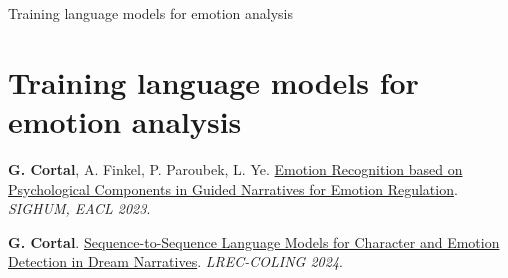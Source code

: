 \documentclass[handout,10pt]{beamer}
\begin{document}
\begin{frame}{}
\Large
\begin{center}
    Training language models for emotion analysis
    \section{Training language models for emotion analysis}
\end{center}

\vspace{1.5cm}

\footnotesize

\textbf{G. Cortal}, A. Finkel, P. Paroubek, L. Ye. \href{https://aclanthology.org/2023.latechclfl-1.8/}{Emotion Recognition based on Psychological Components in Guided Narratives for Emotion Regulation}. \textit{SIGHUM, EACL 2023}.

\vspace{0.5cm}

\textbf{G. Cortal}. \href{https://aclanthology.org/2024.lrec-main.1282/}{Sequence-to-Sequence Language Models for Character and Emotion Detection in Dream Narratives}. \textit{LREC-COLING 2024}.

\end{frame}
\end{document}
